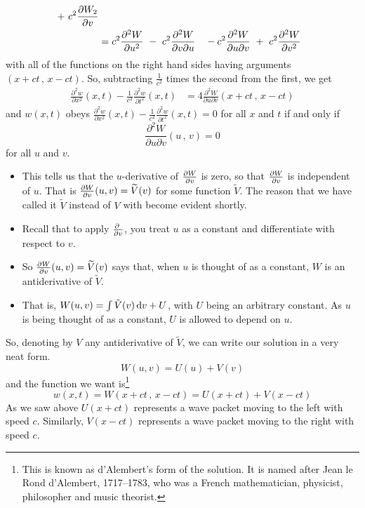 \begin{eg}
\begin{alignat*}{3}
     \ +\  c^2\pdiff{W_2}{v}  \\
&=c^2\frac{\partial^2 W}{\partial u^2}  
     \ -\  c^2\frac{\partial^2 W}{\partial v\partial u}
    && - c^2\frac{\partial^2 W}{\partial u\partial v}
     \ +\  c^2\frac{\partial^2 W}{\partial v^2}  
\end{alignat*}
with all of the functions on the right hand sides having arguments
$(x+ct\,,\,x-ct)$. So, subtracting $\frac{1}{c^2}$ times the second from the
first, we get
\begin{align*}
\frac{\partial^2 w}{\partial x^2}(x,t)
         -\frac{1}{c^2}\frac{\partial^2 w}{\partial t^2}(x,t)
&=4 \frac{\partial^2 W}{\partial u\partial v}(x+ct\,,\,x-ct)
\end{align*}
and $w(x,t)$ obeys $\frac{\partial^2 w}{\partial x^2}(x,t)
         -\frac{1}{c^2}\frac{\partial^2 w}{\partial t^2}(x,t)=0$
for all $x$ and $t$ if and only if 
\begin{equation*}
\frac{\partial^2 W}{\partial u\partial v}(u\,,\,v)=0
\end{equation*}
for all $u$ and $v$. 

\begin{itemize}
\item
This tells us that the $u$-derivative of $\pdiff{W}{v}$ is zero, 
so that $\pdiff{W}{v}$ is independent of $u$.
That is $\pdiff{W}{v}(u,v) = \widetilde V(v)$ for some function $\tilde V$.
The reason that we have called it $\widetilde V$ instead of $V$ with become
evident shortly.
\item
Recall that to apply $\pdiff{}{v}$, you treat $u$ as a constant
and differentiate with respect to $v$. 
\item 
So $\pdiff{W}{v}(u,v) = \widetilde V(v)$ says that, when $u$ is thought 
of as a constant, $W$ is an antiderivative of $\widetilde V$. 
\item
That is, $W(u,v) = \int \tilde V(v)\,\mathrm{d}v +U$,
with $U$ being an arbitrary constant. As $u$ is being thought of as 
a constant, $U$ is allowed to depend on $u$. 
\end{itemize}\noindent
So, denoting by $V$ any antiderivative of $\tilde V$, we can write
our solution in a very neat form.
\begin{equation*}
W(u,v) = U(u) + V(v)
\end{equation*}
and the function we want is\footnote{This is known as d'Alembert's form
of the solution. It is named after Jean le Rond d'Alembert, 1717--1783,
who was a French mathematician, physicist, philosopher and music
theorist.}
\begin{equation*}
w(x,t) = W(x+ct\,,\,x-ct)
       = U(x+ct) + V(x-ct)
\end{equation*}
As we saw above $U(x+ct)$ represents a wave packet moving to the 
left with speed $c$. Similarly, $V(x-ct)$ represents a wave packet 
moving to the right with speed $c$.


\end{eg}
